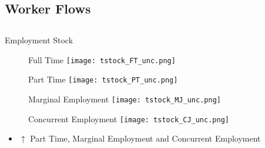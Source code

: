 \documentclass[hyperref={bookmarks=false}]{beamer}
\let\oldcite=\cite
\renewcommand{\cite}[1]{\textcolor[rgb]{.0,.2,.7}{\oldcite{#1}}}
\begin{document}
\begin{appendix}
\section{Worker Flows}
\subsection{}

\begin{frame}
\label{WFLOW}
\end{frame}

\begin{frame}{Employment Stock}
\begin{figure}[!t]
\centering
\begin{minipage}[b]{0.4\textwidth}{Full Time}
\centering
\texttt{[image: tstock\_FT\_unc.png]}
\end{minipage}
\begin{minipage}[b]{0.4\textwidth}{Part Time}
\centering
\texttt{[image: tstock\_PT\_unc.png]}
\end{minipage}
\begin{minipage}[b]{0.4\textwidth}{Marginal Employment}
\centering
\texttt{[image: tstock\_MJ\_unc.png]}
\end{minipage}
\begin{minipage}[b]{0.4\textwidth}{Concurrent Employment}
\centering
\texttt{[image: tstock\_CJ\_unc.png]}
\end{minipage}
\end{figure}
\begin{itemize}
\setlength{\itemsep}{0.7 cm}
\item $\uparrow$ Part Time, Marginal Employment and Concurrent Employment \cite{CarriTuRo15} 
\end{itemize}
\end{frame}


\end{appendix}
\end{document}
